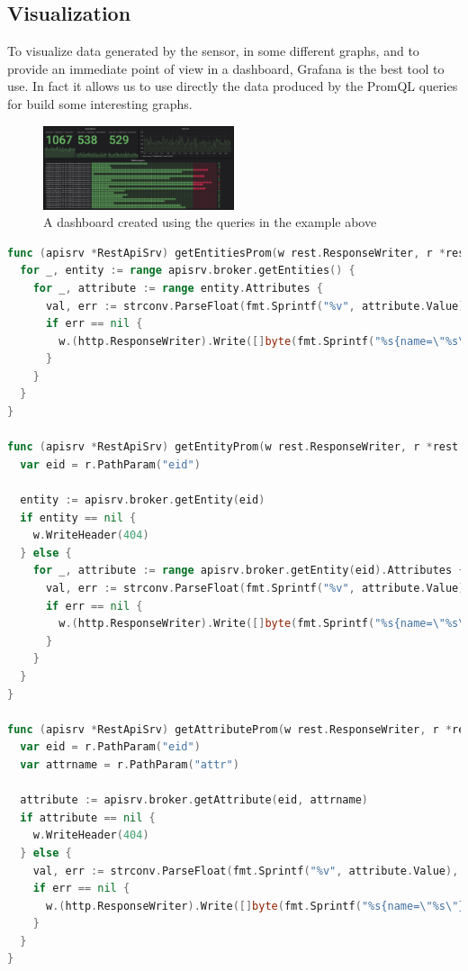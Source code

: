 \documentclass[conference]{ieeeconf}
\begin{document}
\subsection{Visualization}
To visualize data generated by the sensor, in some different graphs, and to provide an immediate point of view in a dashboard, Grafana is the best tool to use.
In fact it allows us to use directly the data produced by the PromQL queries for build some interesting graphs.
\begin{figure}[ht]
    \centering
    \includegraphics[width=0.5\textwidth]{Images/dashboard.png}
    \caption{A dashboard created using the queries in the example above}
\end{figure}{}

\printbibliography

\onecolumn
\begin{lstlisting}[language=go, breaklines=true]
func (apisrv *RestApiSrv) getEntitiesProm(w rest.ResponseWriter, r *rest.Request) {
  for _, entity := range apisrv.broker.getEntities() {
    for _, attribute := range entity.Attributes {
      val, err := strconv.ParseFloat(fmt.Sprintf("%v", attribute.Value), 64)
      if err == nil {
        w.(http.ResponseWriter).Write([]byte(fmt.Sprintf("%s{name=\"%s\"} %v\n", strings.ReplaceAll(entity.Entity.ID, ".", "_"), attribute.Name, val)))
      }
    }
  }
}

func (apisrv *RestApiSrv) getEntityProm(w rest.ResponseWriter, r *rest.Request) {
  var eid = r.PathParam("eid")

  entity := apisrv.broker.getEntity(eid)
  if entity == nil {
    w.WriteHeader(404)
  } else {
    for _, attribute := range apisrv.broker.getEntity(eid).Attributes {
      val, err := strconv.ParseFloat(fmt.Sprintf("%v", attribute.Value), 64)
      if err == nil {
        w.(http.ResponseWriter).Write([]byte(fmt.Sprintf("%s{name=\"%s\"} %v\n", strings.ReplaceAll(entity.Entity.ID, ".", "_"), attribute.Name, val)))
      }
    }
  }
}

func (apisrv *RestApiSrv) getAttributeProm(w rest.ResponseWriter, r *rest.Request) {
  var eid = r.PathParam("eid")
  var attrname = r.PathParam("attr")

  attribute := apisrv.broker.getAttribute(eid, attrname)
  if attribute == nil {
    w.WriteHeader(404)
  } else {
    val, err := strconv.ParseFloat(fmt.Sprintf("%v", attribute.Value), 64)
    if err == nil {
      w.(http.ResponseWriter).Write([]byte(fmt.Sprintf("%s{name=\"%s\"} %v\n", strings.ReplaceAll(eid, ".", "_"), attribute.Name, val)))
    }
  }
}
\end{lstlisting}{}
\end{document}
